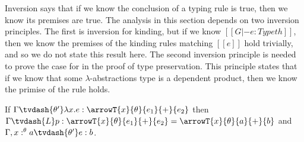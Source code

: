 Inversion says that if we know the conclusion of a typing rule is
true, then we know its premises are true.  The analysis in this
section depends on two inversion principles.  The first is inversion
for kinding, but if we know $[[G |- e : Type th]]$, then we know the
premises of the kinding rules matching $[[e]]$ hold trivially, and so
we do not state this result here.  The second inversion principle is
needed to prove the case for  in the proof of
type preservation.  This principle states that if we know that some
$\lambda$-abstractions type is a dependent product, then we know the
primise of the  rule holds.

\begin{lemma}[Inversion]
  \label{lemma:inversion}
  If $\Gamma \tvdash{\theta'} \lambda x.e:\arrowT{x}{\theta}{e_1}{+}{e_2}$ 
  then 
  $\Gamma \tvdash{L} p:\arrowT{x}{\theta}{e_1}{+}{e_2} = \arrowT{x}{\theta}{a}{+}{b}$
  and
  $\Gamma,x:^\theta a \tvdash{\theta'} e:b$.
\end{lemma}

